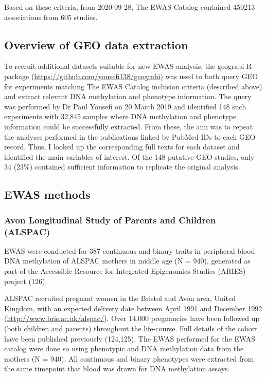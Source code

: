 \documentclass[11pt,oneside]{bristolthesis}
\begin{document}
Based on these criteria, from 2020-09-28, The EWAS Catalog contained 450213 associations from 605 studies.

\hypertarget{overview-of-geo-data-extraction}{%
\subsection{Overview of GEO data extraction}\label{overview-of-geo-data-extraction}}

To recruit additional datasets suitable for new EWAS analysis, the geograbi R package (\url{https://github.com/yousefi138/geograbi}) was used to both query GEO for experiments matching The EWAS Catalog inclusion criteria (described above) and extract relevant DNA methylation and phenotype information. The query was performed by Dr Paul Yousefi on 20 March 2019 and identified 148 such experiments with 32,845 samples where DNA methylation and phenotype information could be successfully extracted. From these, the aim was to repeat the analyses performed in the publications linked by PubMed IDs to each GEO record. Thus, I looked up the corresponding full texts for each dataset and identified the main variables of interest. Of the 148 putative GEO studies, only 34 (23\%) contained sufficient information to replicate the original analysis.

\hypertarget{ewas-methods-03}{%
\subsection{EWAS methods}\label{ewas-methods-03}}

\hypertarget{alspac-03}{%
\subsubsection{Avon Longitudinal Study of Parents and Children (ALSPAC)}\label{alspac-03}}

EWAS were conducted for 387 continuous and binary traits in peripheral blood DNA methylation of ALSPAC mothers in middle age (N = 940), generated as part of the Accessible Resource for Integrated Epigenomics Studies (ARIES) project (126).

ALSPAC recruited pregnant women in the Bristol and Avon area, United Kingdom, with an expected delivery date between April 1991 and December 1992 (\url{http://www.bris.ac.uk/alspac/}). Over 14,000 pregnancies have been followed up (both children and parents) throughout the life-course. Full details of the cohort have been published previously (124,125). The EWAS performed for the EWAS catalog were done so using phenotypic and DNA methylation data from the mothers (N = 940).
All continuous and binary phenotypes were extracted from the same timepoint that blood was drawn for DNA methylation assays.
\end{document}

